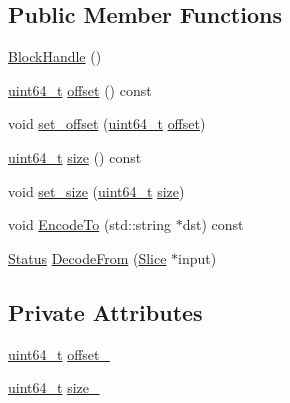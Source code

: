 \subsection*{Public Member Functions}
\begin{DoxyCompactItemize}
\item 
\hyperlink{classleveldb_1_1_block_handle_af2764f113b34af923ba196eb94cb2d09}{Block\+Handle} ()
\item 
\hyperlink{stdint_8h_aaa5d1cd013383c889537491c3cfd9aad}{uint64\+\_\+t} \hyperlink{classleveldb_1_1_block_handle_a31071c24f77e52a3bfc3a228f9f6c133}{offset} () const 
\item 
void \hyperlink{classleveldb_1_1_block_handle_ae6dad857a4f7f5e051762f874f0050bc}{set\+\_\+offset} (\hyperlink{stdint_8h_aaa5d1cd013383c889537491c3cfd9aad}{uint64\+\_\+t} \hyperlink{classleveldb_1_1_block_handle_a31071c24f77e52a3bfc3a228f9f6c133}{offset})
\item 
\hyperlink{stdint_8h_aaa5d1cd013383c889537491c3cfd9aad}{uint64\+\_\+t} \hyperlink{classleveldb_1_1_block_handle_a44931c9086cb3c30f767c751c3a7daec}{size} () const 
\item 
void \hyperlink{classleveldb_1_1_block_handle_a47a4169dce3026122b76d594453b78a8}{set\+\_\+size} (\hyperlink{stdint_8h_aaa5d1cd013383c889537491c3cfd9aad}{uint64\+\_\+t} \hyperlink{classleveldb_1_1_block_handle_a44931c9086cb3c30f767c751c3a7daec}{size})
\item 
void \hyperlink{classleveldb_1_1_block_handle_a71aa041d686d43e66ab570fce1ac388e}{Encode\+To} (std\+::string $\ast$dst) const 
\item 
\hyperlink{classleveldb_1_1_status}{Status} \hyperlink{classleveldb_1_1_block_handle_a1660fd202984d8d5bfa4bed6c5613621}{Decode\+From} (\hyperlink{classleveldb_1_1_slice}{Slice} $\ast$input)
\end{DoxyCompactItemize}
\subsection*{Private Attributes}
\begin{DoxyCompactItemize}
\item 
\hyperlink{stdint_8h_aaa5d1cd013383c889537491c3cfd9aad}{uint64\+\_\+t} \hyperlink{classleveldb_1_1_block_handle_ae235db13a2732b6c6f9c5af7bfecdbd1}{offset\+\_\+}
\item 
\hyperlink{stdint_8h_aaa5d1cd013383c889537491c3cfd9aad}{uint64\+\_\+t} \hyperlink{classleveldb_1_1_block_handle_a2cbf22e0eb41dbc60d2b4396b85cde7e}{size\+\_\+}
\end{DoxyCompactItemize}


